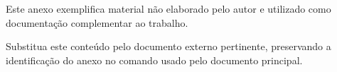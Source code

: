 \label{an:exemplo-a}

Este anexo exemplifica material não elaborado pelo autor e utilizado como documentação complementar ao trabalho.

Substitua este conteúdo pelo documento externo pertinente, preservando a identificação do anexo no comando \texttt{\string\annex} usado pelo documento principal.
